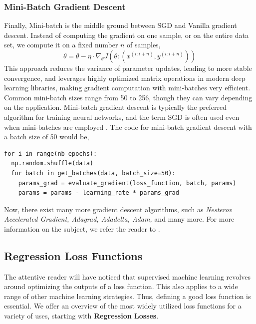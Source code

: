 \documentclass{article}
\begin{document}
\subsubsection{Mini-Batch Gradient Descent}%
  \label{sub:Mini-Batch Gradient Descent}
  Finally, Mini-batch is the middle ground between SGD and Vanilla gradient descent. Instead of computing the gradient on one sample, or on the entire data set, we compute it on a fixed number $n$ of samples, 
  $$\theta = \theta - \eta \cdot \nabla_\theta J(\theta: (x^{(i:i+n)} ,y^{(i:i+n)}))$$
This approach reduces the variance of parameter updates, leading to more stable convergence, and leverages highly optimized matrix operations in modern deep learning libraries, making gradient computation with mini-batches very efficient. Common mini-batch sizes range from 50 to 256, though they can vary depending on the application. Mini-batch gradient descent is typically the preferred algorithm for training neural networks, and the term SGD is often used even when mini-batches are employed \citep{ruder2017overview}. The code for mini-batch gradient descent with a batch size of 50 would be, 
\begin{verbatim}
for i in range(nb_epochs): 
  np.random.shuffle(data)
  for batch in get_batches(data, batch_size=50):
    params_grad = evaluate_gradient(loss_function, batch, params) 
    params = params - learning_rate * params_grad
\end{verbatim}

Now, there exist many more gradient descent algorithms, such as \textit{Nesterov Accelerated Gradient, Adagrad, Adadelta, Adam,} and many more. For more information on the subject, we refer the reader to \cite{ruder2017overview}.
  \subsection{Regression Loss Functions}%
  \label{sub:Loss Function}
  The attentive reader will have noticed that supervised machine learning revolves around optimizing the outputs of a loss function. This also applies to a wide range of other machine learning strategies. Thus, defining a good loss function is essential. We offer an overview of the most widely utilized loss functions for a variety of uses, starting with \textbf{Regression Losses}.
\end{document}
